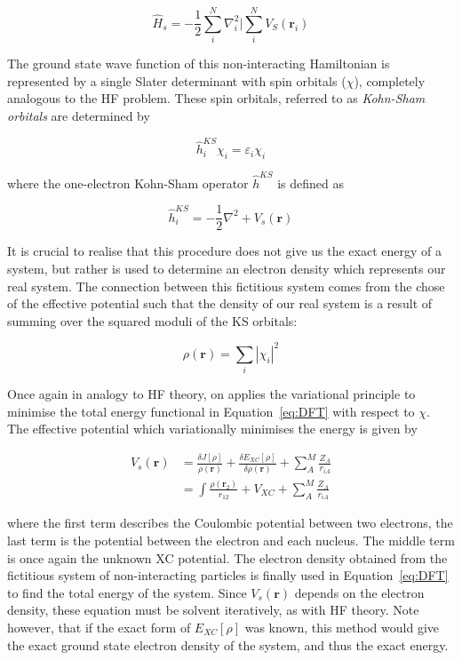 \begin{equation}
  \hat{H}_s = -\frac{1}{2}\sum_i^N\nabla_i^2 | \sum_i^NV_S(\mathbf{r}_i)
\end{equation}

\noindent The ground state wave function of this non-interacting Hamiltonian is represented by a single Slater determinant with spin orbitals ($\chi$), completely analogous to the HF problem. These spin orbitals, referred to as \emph{Kohn-Sham orbitals} are determined by

\begin{equation}
  \hat{h}_i^{KS} \chi_i = \varepsilon_i \chi_i
  \label{eq:kohnsham}
\end{equation}

\noindent where the one-electron Kohn-Sham operator $\hat{h}^{KS}$ is defined as

\begin{equation}
  \hat{h}_i^{KS} = -\frac{1}{2}\nabla^2 + V_s(\mathbf{r})
  \label{eq:ksoperator}
\end{equation}

It is crucial to realise that this procedure does not give us the exact energy of a system, but rather is used to determine an electron density which represents our real system. The connection between this fictitious system comes from the chose of the effective potential such that the density of our real system is a result of summing over the squared moduli of the KS orbitals:

\begin{equation}
  \rho(\mathbf{r}) = \sum_i | \chi_i |^2
\end{equation}

Once again in analogy to HF theory, on applies the variational principle to minimise the total energy functional in Equation~\ref{eq:DFT} with respect to $\chi$. The effective potential which variationally minimises the energy is given by\cite{Parr1995}

\begin{equation}
\begin{split}
  V_s(\mathbf{r}) &= \frac{\delta J[\rho]}{\rho(\mathbf{r})} + \frac{\delta E_{XC}[\rho]}{\delta \rho(\mathbf{r})} + \sum_A^M \frac{Z_A}{r_{iA}} \\
  &= \int\frac{\rho(\mathbf{r}_2)}{r_{12}} + V_{XC} + \sum_A^M \frac{Z_A}{r_{iA}}
\end{split}
\end{equation}

\noindent where the first term describes the Coulombic potential between two electrons, the last term is the potential between the electron and each nucleus. The middle term is once again the unknown XC potential. The electron density obtained from the fictitious system of non-interacting particles is finally used in Equation~\ref{eq:DFT} to find the total energy of the system. Since $V_s(\mathbf{r})$ depends on the electron density, these equation must be solvent iteratively, as with HF theory. Note however, that if the exact form of $E_{XC}[\rho]$ was known, this method would give the exact ground state electron density of the system, and thus the exact energy.

